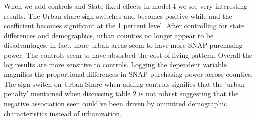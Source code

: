 \documentclass{article}
\begin{document}
When we add controls and State fixed effects  in model 4 we see very interesting results. The Urban share sign switches and becomes positive while and the coefficient becomes significant at the 1 percent level. After controlling for state differences and demographics, urban counties no longer appear to be disadvantages, in fact, more urban areas seem to have more SNAP purchasing power. The controls seem to have absorbed the cost of living pattern. Overall the log results are more sensitive to controls. Logging the dependent variable magnifies the proportional differences in SNAP purchasing power across counties. The sign switch on Urban Share when adding controls signifies that the 'urban penalty' mentioned when discussing table 2 is not robust suggesting that the negative association seen could've been driven by ommitted demographic characteristics instead of urbanization. 
\end{document}

